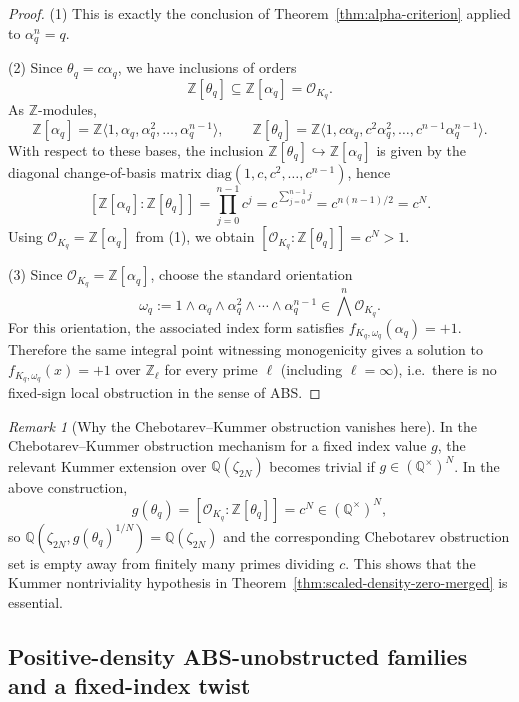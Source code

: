 \documentclass[11pt,letterpaper]{amsart}
\newcommand{\Z}{\mathbb{Z}}
\newcommand{\Q}{\mathbb{Q}}
\newcommand{\Ocal}{\mathcal{O}}
\theoremstyle{plain}
\theoremstyle{definition}
\theoremstyle{remark}
\newtheorem{remark}[theorem]{Remark}
\theoremstyle{plain}
\begin{document}
\begin{proof}
(1) This is exactly the conclusion of Theorem~\ref{thm:alpha-criterion} applied to $\alpha_q^n=q$.

(2) Since $\theta_q=c\alpha_q$, we have inclusions of orders
\[
\Z[\theta_q]\subseteq \Z[\alpha_q]=\Ocal_{K_q}.
\]
As $\Z$-modules,
\[
\Z[\alpha_q]=\Z\langle 1,\alpha_q,\alpha_q^2,\dots,\alpha_q^{n-1}\rangle,
\qquad
\Z[\theta_q]=\Z\langle 1,c\alpha_q,c^2\alpha_q^2,\dots,c^{n-1}\alpha_q^{n-1}\rangle.
\]
With respect to these bases, the inclusion $\Z[\theta_q]\hookrightarrow \Z[\alpha_q]$ is given by the diagonal
change-of-basis matrix $\mathrm{diag}(1,c,c^2,\dots,c^{n-1})$, hence
\[
[\Z[\alpha_q]:\Z[\theta_q]]
=\prod_{j=0}^{n-1}c^j
=c^{\sum_{j=0}^{n-1}j}
=c^{n(n-1)/2}
=c^N.
\]
Using $\Ocal_{K_q}=\Z[\alpha_q]$ from (1), we obtain $[\Ocal_{K_q}:\Z[\theta_q]]=c^N>1$.

(3) Since $\Ocal_{K_q}=\Z[\alpha_q]$, choose the standard orientation
\[
\omega_q:=1\wedge \alpha_q\wedge \alpha_q^2\wedge\cdots\wedge \alpha_q^{n-1}\in \bigwedge^n \Ocal_{K_q}.
\]
For this orientation, the associated index form satisfies $f_{K_q,\omega_q}(\alpha_q)=+1$.
Therefore the same integral point witnessing monogenicity gives a solution to $f_{K_q,\omega_q}(x)=+1$
over $\Z_\ell$ for every prime $\ell$ (including $\ell=\infty$), i.e.\ there is no fixed-sign local obstruction in the
sense of \textsc{ABS}.
\end{proof}

\begin{remark}[Why the Chebotarev--Kummer obstruction vanishes here]
\label{rem:kummer-trivial}
In the Chebotarev--Kummer obstruction mechanism for a fixed index value $g$, the relevant Kummer extension over
$\Q(\zeta_{2N})$ becomes trivial if $g\in (\Q^\times)^N$.
In the above construction,
\[
g(\theta_q)=[\Ocal_{K_q}:\Z[\theta_q]]=c^N\in (\Q^\times)^N,
\]
so $\Q(\zeta_{2N},g(\theta_q)^{1/N})=\Q(\zeta_{2N})$ and the corresponding Chebotarev obstruction set is empty
away from finitely many primes dividing $c$.
This shows that the Kummer nontriviality hypothesis in Theorem~\ref{thm:scaled-density-zero-merged} is essential.
\end{remark}

\subsection{Positive-density \textsc{ABS}-unobstructed families and a fixed-index twist}
\label{subsec:positive-density-ABS-families}
\end{document}

